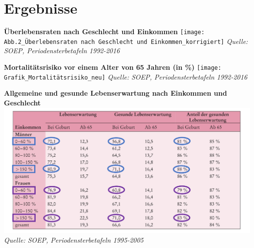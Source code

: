 \documentclass{beamer}
\begin{document}
\section{Ergebnisse}
\begin{frame}
\textbf{Überlebensraten nach Geschlecht und Einkommen}
	\texttt{[image: Abb.2\_Überlebensraten nach Geschlecht und Einkommen\_korrigiert]}
	\emph{Quelle: SOEP, Periodensterbetafeln 1992-2016}
\end{frame}

\begin{frame}
\textbf{Mortalitätsrisiko vor einem Alter von 65 Jahren (in \%) }
	\texttt{[image: Grafik\_Mortalitätsrisiko\_neu]}
	\emph{Quelle: SOEP, Periodensterbetafeln 1992-2016}
\end{frame}

\begin{frame}
  \textbf{Allgemeine und gesunde Lebenserwartung nach Einkommen und Geschlecht}\\
	\includegraphics[scale=0.46]{Tabelle_ellipsen}
	\emph{Quelle: SOEP, Periodensterbetafeln 1995-2005}
\end{frame}
 
 
\end{document}
